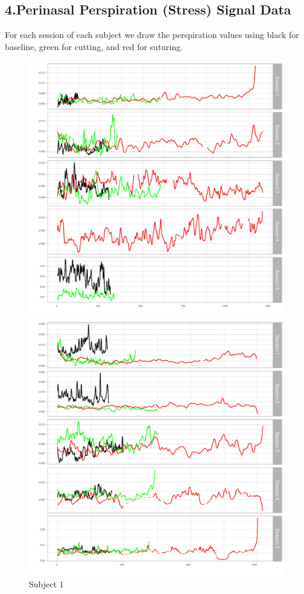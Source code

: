 \documentclass[12pt,epsf]{report}
\begin{document}
{\subsection*{4.Perinasal Perspiration (Stress) Signal Data}
For each session of each subject  we draw the perspiration values using black for baseline, green for cutting, and red for suturing. 
\begin{figure}[!htb]
	\begin{minipage}[c]{0.5\linewidth}
	\includegraphics[width=\linewidth]{01_Perinasal_Perspiration.pdf}
	\caption{Subject 1 }
	\end{minipage}
	\hfill
	\begin{minipage}[c]{0.5\linewidth}
	\includegraphics[width=\linewidth]{02_Perinasal_Perspiration.pdf}

\end{minipage}
\end{figure}}
\end{document}
